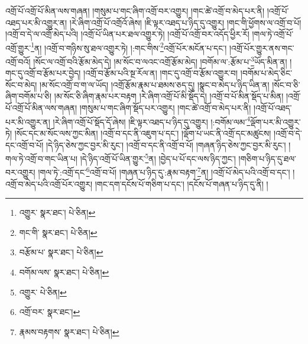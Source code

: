 འགྲོ་པོ་འགྲོ་པོ་མིན་ལས་གཞན། །གསུམ་པ་གང་ཞིག་འགྲོ་བར་འགྱུར། །གང་ཚེ་འགྲོ་བ་མེད་པར་ནི། །འགྲོ་པོ་འཐད་པར་མི་འགྱུར་ན། །རེ་ཞིག་འགྲོ་པོ་འགྲོའོ་ཞེས། །ཇི་ལྟར་འཐད་པ་ཉིད་དུ་འགྱུར། །གང་གི་ཕྱོགས་ལ་འགྲོ་བ་པོ། །འགྲོ་བ་དེ་ལ་འགྲོ་མེད་པའི། །འགྲོ་པོ་ཡིན་པར་ཐལ་འགྱུར་ཏེ། །འགྲོ་པོ་འགྲོ་བར་འདོད་ཕྱིར་རོ། །གལ་ཏེ་འགྲོ་པོ་འགྲོ་གྱུར་\footnote{འགྱུར་  སྣར་ཐང་།  པེ་ཅིན། }ན། །འགྲོ་བ་གཉིས་སུ་ཐལ་འགྱུར་ཏེ། །:གང་གིས་\footnote{གང་གི་  སྣར་ཐང་།  པེ་ཅིན། }འགྲོ་པོར་མངོན་པ་དང་། །འགྲོ་པོར་གྱུར་ནས་གང་འགྲོ་བའོ། །སོང་ལ་འགྲོ་བའི་རྩོམ་མེད་དེ། །མ་སོང་བ་ལའང་འགྲོ་རྩོམ་མེད། །བགོམ་ལ་:རྩོམ་པ་\footnote{བརྩོམ་པ་  སྣར་ཐང་།  པེ་ཅིན། }ཡོད་མིན་ན། །གང་དུ་འགྲོ་བ་རྩོམ་པར་བྱེད། །འགྲོ་བ་རྩོམ་པའི་སྔ་རོལ་ན། །གང་དུ་འགྲོ་བ་རྩོམ་འགྱུར་བ། །བགོམ་པ་མེད་ཅིང་སོང་བ་མེད། །མ་སོང་འགྲོ་བ་ག་ལ་ཡོད། །འགྲོ་རྩོམ་རྣམ་པ་ཐམས་ཅད་དུ། །སྣང་བ་མེད་པ་ཉིད་ཡིན་ན། །སོང་བ་ཅི་ཞིག་བགོམ་པ་ཅི། །མ་སོང་ཅི་ཞིག་རྣམ་པར་བརྟག །རེ་ཞིག་འགྲོ་པོ་མི་སྡོད་དེ། །འགྲོ་བ་པོ་མིན་སྡོད་པ་མིན། །འགྲོ་པོ་འགྲོ་པོ་མིན་ལས་གཞན། །གསུམ་པ་གང་ཞིག་སྡོད་པར་འགྱུར། །གང་ཚེ་འགྲོ་བ་མེད་པར་ནི། །འགྲོ་པོ་འཐད་པར་མི་འགྱུར་ན། །རེ་ཞིག་འགྲོ་པོ་སྡོད་དོ་ཞེས། །ཇི་ལྟར་འཐད་པ་ཉིད་དུ་འགྱུར། །:བགོམ་ལམ་\footnote{བགོམ་ལས་  སྣར་ཐང་།  པེ་ཅིན། }ལྡོག་པར་མི་འགྱུར་ཏེ། །སོང་དང་མ་སོང་ལས་ཀྱང་མིན། །འགྲོ་བ་དང་ནི་འཇུག་པ་དང་། །ལྡོག་པ་ཡང་ནི་འགྲོ་དང་མཚུངས། །འགྲོ་བ་དེ་དང་འགྲོ་བ་པོ། །དེ་ཉིད་ཅེས་ཀྱང་བྱར་མི་རུང་། །འགྲོ་བ་དང་ནི་འགྲོ་བ་པོ། །གཞན་ཉིད་ཅེས་ཀྱང་བྱར་མི་རུང་། །གལ་ཏེ་འགྲོ་བ་གང་ཡིན་པ། །དེ་ཉིད་འགྲོ་པོ་ཡིན་གྱུར་\footnote{འགྱུར་  པེ་ཅིན། }ན། །བྱེད་པ་པོ་དང་ལས་ཉིད་ཀྱང་། །གཅིག་པ་ཉིད་དུ་ཐལ་བར་འགྱུར། །གལ་ཏེ་:འགྲོ་དང་\footnote{འགྲོ་བར་  སྣར་ཐང་། }འགྲོ་བ་པོ། །གཞན་པ་ཉིད་དུ་:རྣམ་བརྟག་\footnote{རྣམས་བརྟགས་  སྣར་ཐང་།  པེ་ཅིན། }ན། །འགྲོ་པོ་མེད་པའི་འགྲོ་བ་དང་། །འགྲོ་བ་མེད་པའི་འགྲོ་པོར་འགྱུར། །གང་དག་དངོས་པོ་གཅིག་པ་དང་། །དངོས་པོ་གཞན་པ་ཉིད་དུ་ནི། །
